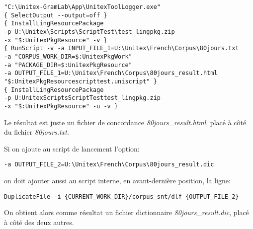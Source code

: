 \begin{verbatim}
"C:\Unitex-GramLab\App\UnitexToolLogger.exe" 
{ SelectOutput --output=off } 
{ InstallLingResourcePackage 
-p U:\Unitex\Scripts\ScriptTest\test_lingpkg.zip 
-x "$:UnitexPkgResource" -v } 
{ RunScript -v -a INPUT_FILE_1=U:\Unitex\French\Corpus\80jours.txt 
-a "CORPUS_WORK_DIR=$:UnitexPkgWork" 
-a "PACKAGE_DIR=$:UnitexPkgResource" 
-a OUTPUT_FILE_1=U:\Unitex\French\Corpus\80jours_result.html 
"$:UnitexPkgResourcescripttest.uniscript" } 
{ InstallLingResourcePackage 
-p U:UnitexScriptsScriptTesttest_lingpkg.zip 
-x "$:UnitexPkgResource" -u -v }
\end{verbatim}

\bigskip
\noindent Le résultat est juste un fichier de concordance \emph{80jours\_result.html}, placé à côté du fichier \emph{80jours.txt}.

\bigskip
\noindent Si on ajoute au script de lancement l'option:

\begin{verbatim}
-a OUTPUT_FILE_2=U:\Unitex\French\Corpus\80jours_result.dic
\end{verbatim}

on doit ajouter aussi au script interne, en avant-dernière position, la ligne:

\begin{verbatim}
DuplicateFile -i {CURRENT_WORK_DIR}/corpus_snt/dlf {OUTPUT_FILE_2}
\end{verbatim}

On obtient alors comme résultat un fichier dictionnaire \emph{80jours\_result.dic}, placé à côté des deux autres.





